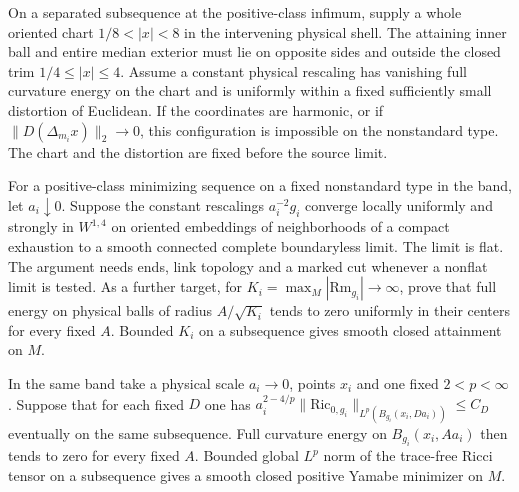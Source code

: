 \begin{proposition}
\label{prop:master-harmonic-annulus}
On a separated subsequence at the positive-class infimum, supply a
whole oriented chart \(1/8<|x|<8\) in the intervening physical shell.
The attaining inner ball and entire median exterior must lie on
opposite sides and outside the closed trim \(1/4\le |x|\le4\).
Assume a constant physical rescaling has vanishing full curvature
energy on the chart and is uniformly within a fixed sufficiently small
distortion of Euclidean. If the coordinates are harmonic, or if
\(\|D(\Delta_{m_i}x)\|_2\to0\), this configuration is impossible on
the nonstandard type. The chart and the distortion are fixed before
the source limit.
\end{proposition}

\begin{theorem}
\label{thm:master-complete-limit}
For a positive-class minimizing sequence on a fixed nonstandard type
in the band, let \(a_i\downarrow0\). Suppose the constant rescalings
\(a_i^{-2}g_i\) converge locally uniformly and strongly in \(W^{1,4}\)
on oriented embeddings of neighborhoods of a compact exhaustion to
a smooth connected complete boundaryless limit. The limit is flat.
The argument needs ends, link topology and a marked cut whenever a
nonflat limit is tested. As a further target, for
\(K_i=\max_M|\mathrm{Rm}_{g_i}|\to\infty\), prove that full energy on
physical balls of radius \(A/\sqrt{K_i}\) tends to zero uniformly in
their centers for every fixed \(A\). Bounded \(K_i\) on a subsequence
gives smooth closed attainment on \(M\).
\end{theorem}

\begin{proposition}
\label{prop:master-ricci-scale}
In the same band take a physical scale \(a_i\to0\), points \(x_i\)
and one fixed \(2<p<\infty\). Suppose that for each fixed \(D\) one has
\(a_i^{2-4/p}\|\mathrm{Ric}_{0,g_i}\|_{L^p(B_{g_i}(x_i,Da_i))}\le C_D\)
eventually on the same subsequence. Full curvature energy on
\(B_{g_i}(x_i,Aa_i)\) then tends to zero for every fixed \(A\).
Bounded global \(L^p\) norm of the trace-free Ricci tensor on a
subsequence gives a smooth closed positive Yamabe minimizer on \(M\).
\end{proposition}

